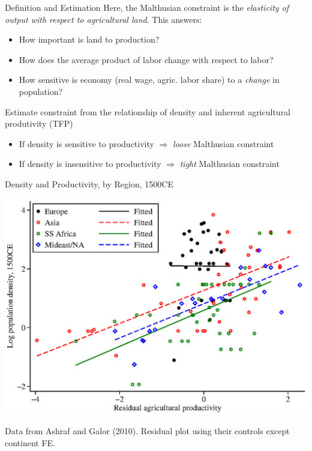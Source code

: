 \documentclass[10pt, xcolor=dvipsnames]{beamer}
\begin{document}
\begin{frame}{Definition and Estimation}\label{define}
Here, the Malthusian constraint is the \textit{elasticity of output with respect to agricultural land}. This answers:
\begin{itemize}
\item How important is land to production?
\item How does the average product of labor change with respect to labor?
\item How sensitive is economy (real wage, agric. labor share) to a \textit{change} in population?
\end{itemize}

\vspace{.2cm} Estimate constraint from the relationship of density and inherent agricultural produtivity (TFP)
\begin{itemize}
  \item If density is sensitive to productivity $\Rightarrow$ \textit{loose} Malthusian constraint
  \item If density is insensitive to productivity $\Rightarrow$ \textit{tight} Malthusian constraint
\end{itemize}
\hfill \hyperlink{toy}{}
\end{frame}


\begin{frame}{Density and Productivity, by Region, 1500CE}
\begin{center}
\includegraphics[width=.8\textwidth]{fig_ag_regions.eps}
\end{center}
{\scriptsize Data from Ashraf and Galor (2010). Residual plot using their controls except continent FE.}
\end{frame}
\end{document}
